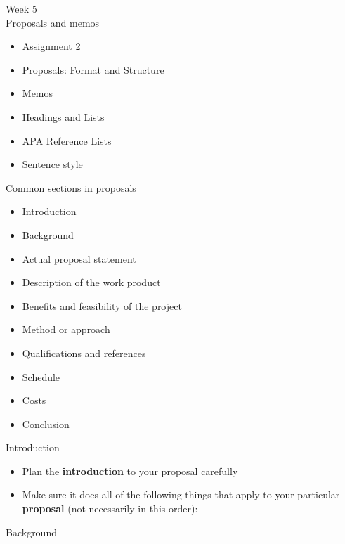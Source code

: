 \documentclass[]{article}
\begin{document}
	\Large{Week 5}\\
	\large{Proposals and memos}
	\normalsize
	\begin{itemize}
		\item Assignment 2
		\item Proposals: Format and Structure
		\item Memos
		\item Headings and Lists
		\item APA Reference Lists
		\item Sentence style
	\end{itemize}
	\vspace{5mm}
	\large{Common sections in proposals}
	\normalsize
	\begin{itemize}
		\item Introduction
		\item Background
		\item Actual proposal statement
		\item Description of the work product
		\item Benefits and feasibility of the project
		\item Method or approach
		\item Qualifications and references
		\item Schedule
		\item Costs
		\item Conclusion
	\end{itemize}
	\vspace{5mm}
	\large{Introduction}
	\normalsize
	\begin{itemize}
		\item Plan the {\bf introduction} to your proposal carefully
		\item Make sure it does all of the following things that apply to your particular {\bf proposal} (not necessarily in this order):
	\end{itemize}
	\vspace{5mm}
	\large{Background}\\
	\normalsize
	
\end{document}
